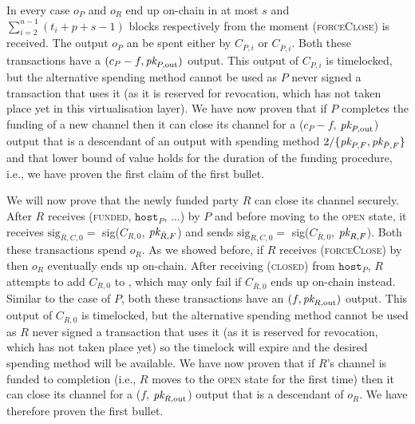   In every case $o_P$ and $o_R$ end up on-chain in at most $s$ and
  $\sum\limits_{i=2}^{n-1}(t_i + p + s - 1)$ blocks respectively from the moment
  (\textsc{forceClose}) is received. The output $o_P$ an be spent either by $C_{P,
  i}$ or $C_{\bar{P}, i}$. Both these transactions have a $(c_P - f, \textit{pk}_{P,
  \mathrm{out}})$ output. This output of $C_{P, i}$ is timelocked, but the
  alternative spending method cannot be used as $P$ never signed a transaction
  that uses it (as it is reserved for revocation, which has not taken place yet
  in this virtualisation layer). We have now proven that if $P$ completes the
  funding of a new channel then it can close its channel for a ($c_P - f$,
  $\textit{pk}_{P, \mathrm{out}}$) output that is a descendant of an output with spending
  method $2/\{\textit{pk}_{P, F}, \textit{pk}_{\bar{P}, F}\}$ and that lower bound of value holds
  for the duration of the funding procedure, i.e., we have proven the first claim
  of the first bullet.

  We will now prove that the newly funded party $R$ can close its channel
  securely. After $R$ receives (\textsc{funded}, $\texttt{host}_P$, $\dots$) by
  $P$ and before moving to the \textsc{open} state, it receives
  $\mathrm{sig}_{\bar{R}, C, 0} =$ sig($C_{R, 0}$, $\textit{pk}_{\bar{R}, F}$) and sends
  $\mathrm{sig}_{R, C, 0} =$ sig($C_{\bar{R}, 0}$, $\textit{pk}_{R, F}$). Both these
  transactions spend $o_R$. As we showed before, if $R$ receives
  (\textsc{forceClose}) by \environment then $o_R$ eventually ends up on-chain. After
  receiving (\textsc{closed}) from $\texttt{host}_P$, $R$ attempts to add $C_{R,
  0}$ to \ledger, which may only fail if $C_{\bar{R}, 0}$ ends up on-chain
  instead. Similar to the case of $P$, both these transactions have an $(f,
  \textit{pk}_{R, \mathrm{out}})$ output. This output of $C_{R, 0}$ is timelocked, but
  the alternative spending method cannot be used as $R$ never signed a
  transaction that uses it (as it is reserved for revocation, which has not
  taken place yet) so the timelock will expire and the desired spending method
  will be available. We have now proven that if $R$'s channel is funded to
  completion (i.e., $R$ moves to the \textsc{open} state for the first time) then
  it can close its channel for a ($f$, $\textit{pk}_{R, \mathrm{out}}$) output that is a
  descendant of $o_R$. We have therefore proven the first bullet.

